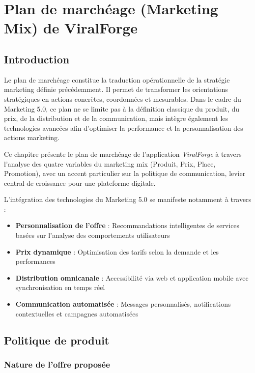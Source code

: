 \chapter{Plan de marchéage (Marketing Mix) de ViralForge}
\label{chap:Plan de marchéage de ViralForge}

\section*{Introduction}

Le plan de marchéage constitue la traduction opérationnelle de la stratégie marketing définie précédemment. Il permet de transformer les orientations stratégiques en actions concrètes, coordonnées et mesurables. Dans le cadre du Marketing 5.0, ce plan ne se limite pas à la définition classique du produit, du prix, de la distribution et de la communication, mais intègre également les technologies avancées afin d'optimiser la performance et la personnalisation des actions marketing.

Ce chapitre présente le plan de marchéage de l'application \textit{ViralForge} à travers l'analyse des quatre variables du marketing mix (Produit, Prix, Place, Promotion), avec un accent particulier sur la politique de communication, levier central de croissance pour une plateforme digitale.

L'intégration des technologies du Marketing 5.0 se manifeste notamment à travers :
\begin{itemize}
    \item \textbf{Personnalisation de l'offre} : Recommandations intelligentes de services basées sur l'analyse des comportements utilisateurs
    \item \textbf{Prix dynamique} : Optimisation des tarifs selon la demande et les performances
    \item \textbf{Distribution omnicanale} : Accessibilité via web et application mobile avec synchronisation en temps réel
    \item \textbf{Communication automatisée} : Messages personnalisés, notifications contextuelles et campagnes automatisées
\end{itemize}

\pagebreak

\section{Politique de produit}

\subsection{Nature de l'offre proposée}

